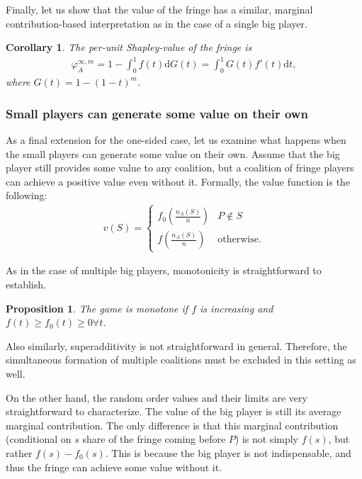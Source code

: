 \documentclass[a4paper]{article}
\newtheorem{proposition}{Proposition}
\newtheorem{corollary}{Corollary}
\newcommand{\dt}{\mathrm{d}t}
\newcommand{\dG}{\mathrm{d}G}
\begin{document}
Finally, let us show that the value of the fringe has a similar, marginal contribution-based interpretation as in the case of a single big player.

\begin{corollary}
    \label{cor:multiple_platforms}
    The per-unit Shapley-value of the fringe is
    \begin{align*}
        \varphi_A^{\infty, m} = 1 - \int_0^1 f(t) \dG(t) = \int_0^1 G(t) f'(t) \dt ,
    \end{align*}
    where $G(t) = 1 - (1-t)^m$.
\end{corollary}


\subsubsection{Small players can generate some value on their own}

As a final extension for the one-sided case, let us examine what happens when the small players can generate some value on their own.
Assume that the big player still provides some value to any coalition, but a coalition of fringe players can achieve a positive value even without it.
Formally, the value function is the following:
\begin{align*}
    v(S) = \begin{cases}
        f_0\left(\frac{n_A(S)}{n}\right) & P \notin S \\
        f\left(\frac{n_A(S)}{n}\right)   & \text{otherwise}.
    \end{cases}
\end{align*}

As in the case of multiple big players, monotonicity is straightforward to establish.
\begin{proposition}
    The game is monotone if $f$ is increasing and $f(t) \geq f_0(t) \geq 0 \forall t$.
\end{proposition}
Also similarly, superadditivity is not straightforward in general.
Therefore, the simultaneous formation of multiple coalitions must be excluded in this setting as well.

On the other hand, the random order values and their limits are very straightforward to characterize.
The value of the big player is still its average marginal contribution.
The only difference is that this marginal contribution (conditional on $s$ share of the fringe coming before $P$) is not simply $f(s)$, but rather $f(s) - f_0(s)$.
This is because the big player is not indispensable, and thus the fringe can achieve some value without it.
\end{document}
